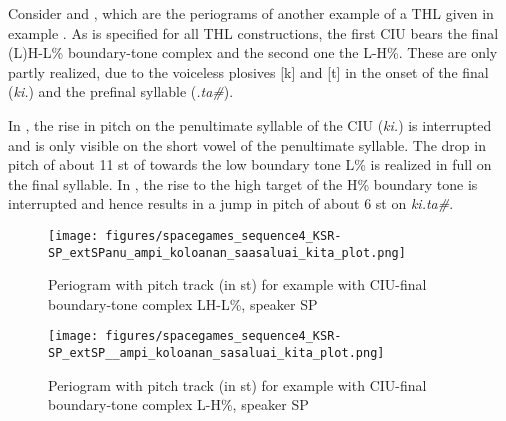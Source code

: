 Consider   and , which are the periograms of  another example of a THL given in  example . As is specified for all THL constructions, the first CIU bears the final (L)H-L\% boundary-tone complex and the second one the L-H\%. These are only partly realized, due to the voiceless plosives [k] and [t] in the onset of the final (\textit{ki.}) and the prefinal syllable (\textit{.ta\#}).


In  , the rise in pitch on the penultimate syllable of the CIU (\textit{ki.}) is interrupted  and is only visible on the short vowel of the penultimate syllable. The drop in pitch of about 11 st of towards the low boundary tone L\% is realized in full on the final syllable. In  ,  the rise to the high target of the H\% boundary tone is interrupted  and hence results in a jump in pitch of about 6 st on \textit{ki.ta\#}.

\begin{figure}
	\texttt{[image: figures/spacegames\_sequence4\_KSR-SP\_extSPanu\_ampi\_koloanan\_saasaluai\_kita\_plot.png]}
	\caption{Periogram with pitch track (in st) for example  with CIU-final boundary-tone complex LH-L\%, speaker SP}
	\label{pitch_anu ampi koloanan saasaluai kita1}
\end{figure}






\begin{figure}
	\texttt{[image: figures/spacegames\_sequence4\_KSR-SP\_extSP\_\_ampi\_koloanan\_sasaluai\_kita\_plot.png]}
	\caption{Periogram with pitch track (in st) for example  with CIU-final boundary-tone complex L-H\%, speaker SP}
	\label{pitch_anu ampi koloanan saasaluai kita2}
\end{figure}


\ea
\label{ex:THLampi koloanan saasaluai kita}

